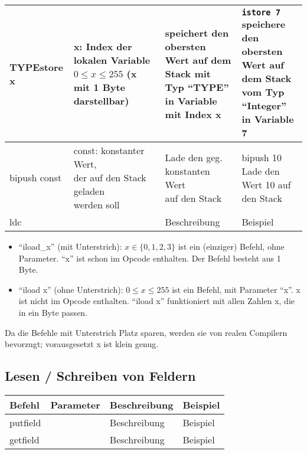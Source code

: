 \begin{table}[H]
\begin{tabular}{l|l|l|l}
		\textbf{TYPE}store x	& \multlineTable{x: Index der lokalen\\ Variable $0 \leq x \leq 255$\\ (x mit 1 Byte darstellbar) }	&	\multlineTable{speichert den obersten Wert auf dem\\ Stack mit Typ \enquote{TYPE} in Variable\\ mit Index x}	& \multlineTable{\texttt{istore 7}\\ speichere den obersten Wert auf\\ dem Stack vom Typ \enquote{Integer}\\ in Variable 7}	\\ \hline	
		
		bipush const& \multlineTable{const: konstanter Wert,\\ der auf den Stack geladen\\ werden soll} & \multlineTable{Lade den geg. konstanten Wert\\ auf den Stack} & \multlineTable{bipush 10\\ Lade den Wert 10 auf den Stack} \\ \hline	
		
		ldc & \open  & Beschreibung & Beispiel \\ \hline
	\end{tabular}
\end{table}


\begin{itemize}
	\item \enquote{iload\_x} (mit Unterstrich): $x \in \{ 0,1,2,3 \}$ ist ein (einziger) Befehl, ohne Parameter. \enquote{x} ist schon im Opcode enthalten. Der Befehl besteht aus 1 Byte.
	\item \enquote{iload x} (ohne Unterstrich): $0 \leq x \leq 255$ ist ein Befehl, mit Parameter \enquote{x}. x ist nicht im Opcode enthalten. \enquote{iload x} funktioniert mit allen Zahlen x, die in ein Byte passen.
\end{itemize}
Da die Befehle mit Unterstrich Platz sparen, werden sie von realen Compilern bevorzugt; vorausgesetzt x ist klein genug.

\subsection{Lesen / Schreiben von Feldern}
\begin{table}[H]
	\centering
	\label{my-label}
	\begin{tabular}{l|l|l|l}
		Befehl & Parameter & Beschreibung & Beispiel \\ \hline
		
		putfield & \open & Beschreibung & Beispiel \\ \hline	
		
		getfield & \open & Beschreibung & Beispiel \\ \hline		
		
	\end{tabular}
\end{table}


